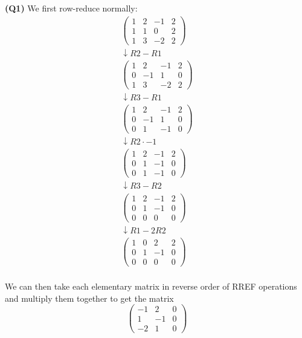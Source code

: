 \documentclass[12pt, a4paper]{article}
\begin{document}
\textbf{(Q1)}
We first row-reduce normally:
\begin{gather*}
    \begin{pmatrix}
        1 & 2 & -1 & 2 \\
        1 & 1 &  0 & 2 \\
        1 & 3 & -2 & 2
    \end{pmatrix}\\
    \downarrow R2 - R1\\
    \begin{pmatrix}
        1 & 2 & -1 & 2 \\
        0 & -1 & 1 & 0 \\
        1 & 3 & -2 & 2
    \end{pmatrix}\\
    \downarrow R3 - R1\\
    \begin{pmatrix}
        1 & 2 & -1 & 2 \\
        0 & -1 & 1 & 0 \\
        0 & 1 & -1 & 0
    \end{pmatrix}\\
    \downarrow R2 \cdot -1\\
    \begin{pmatrix}
        1 & 2 & -1 & 2 \\
        0 & 1 & -1 & 0 \\
        0 & 1 & -1 & 0
    \end{pmatrix}\\
    \downarrow R3 - R2\\
    \begin{pmatrix}
        1 & 2 & -1 & 2 \\
        0 & 1 & -1 & 0 \\
        0 & 0 &  0 & 0
    \end{pmatrix}\\
    \downarrow R1 - 2R2\\
    \begin{pmatrix}
        1 & 0 &  2 & 2 \\
        0 & 1 & -1 & 0 \\
        0 & 0 &  0 & 0
    \end{pmatrix}\\
\end{gather*}

We can then take each elementary matrix in reverse order of RREF operations
and multiply them together to get the matrix
\[
    \begin{pmatrix}
        -1 &  2 & 0 \\
        1  & -1 & 0 \\
        -2 &  1 & 0
    \end{pmatrix}
\]
\end{document}
